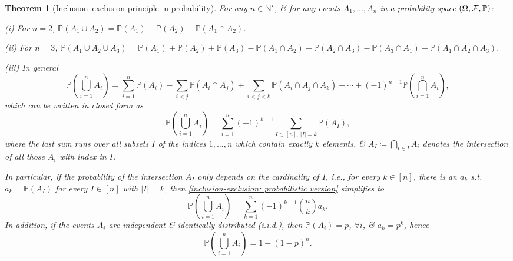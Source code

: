 \documentclass[oneside]{book}
\newtheorem{theorem}{Theorem}
\begin{document}
\begin{theorem}[Inclusion--exclusion principle in probability]
	\label{thm: inclusion-exclusion: probabilistic version}
	For any $n\in\mathbb{N}^\star$, \& for any events $A_1,\ldots,A_n$ in a \href{https://en.wikipedia.org/wiki/Probability_space}{probability space} $(\Omega,{\cal F},\mathbb{P})$:
	\item(i) For $n = 2$, $\mathbb{P}(A_1\cup A_2) = \mathbb{P}(A_1) + \mathbb{P}(A_2) - \mathbb{P}(A_1\cap A_2)$.
	\item(ii) For $n = 3$, $\mathbb{P}(A_1\cup A_2\cup A_3) = \mathbb{P}(A_1) + \mathbb{P}(A_2) + \mathbb{P}(A_3) - \mathbb{P}(A_1\cap A_2) - \mathbb{P}(A_2\cap A_3) - \mathbb{P}(A_3\cap A_1) + \mathbb{P}(A_1\cap A_2\cap A_3)$.
	\item(iii) In general
	\begin{equation}
		\mathbb{P}\left(\bigcup_{i=1}^n A_i\right) = \sum_{i=1}^n \mathbb{P}(A_i) - \sum_{i < j} \mathbb{P}(A_i\cap A_j) + \sum_{i < j < k} \mathbb{P}(A_i\cap A_j\cap A_k) + \cdots + (-1)^{n-1}\mathbb{P}\left(\bigcap_{i=1}^n A_i\right),
	\end{equation}
	which can be written in closed form as
	\begin{equation}
		\label{inclusion-exclusion: probabilistic version}
		\mathbb{P}\left(\bigcup_{i=1}^n A_i\right) = \sum_{i=1}^n (-1)^{k-1}\sum_{I\subset[n],\,|I| = k} \mathbb{P}(A_I),
	\end{equation}
	where the last sum runs over all subsets $I$ of the indices $1,\ldots,n$ which contain exactly $k$ elements, \& $A_I\coloneqq\bigcap_{i\in I} A_i$ denotes the intersection of all those $A_i$ with index in $I$.
	
	In particular, if the probability of the intersection $A_I$ only depends on the cardinality of $I$, i.e., for every $k\in[n]$, there is an $a_k$ s.t. $a_k = \mathbb{P}(A_I)$ for every $I\in[n]$ with $|I| = k$, then \eqref{inclusion-exclusion: probabilistic version} simplifies to
	\begin{equation*}
		\mathbb{P}\left(\bigcup_{i=1}^n A_i\right) = \sum_{k=1}^n (-1)^{k-1}\binom{n}{k}a_k.
	\end{equation*}
	In addition, if the events $A_i$ are \href{https://en.wikipedia.org/wiki/Independent_and_identically_distributed}{independent \& identically distributed} (i.i.d.), then $\mathbb{P}(A_i) = p$, $\forall i$, \& $a_k = p^k$, hence
	\begin{equation*}
		\mathbb{P}\left(\bigcup_{i=1}^n A_i\right) = 1 - (1 - p)^n.
	\end{equation*}
\end{theorem}
\end{document}
